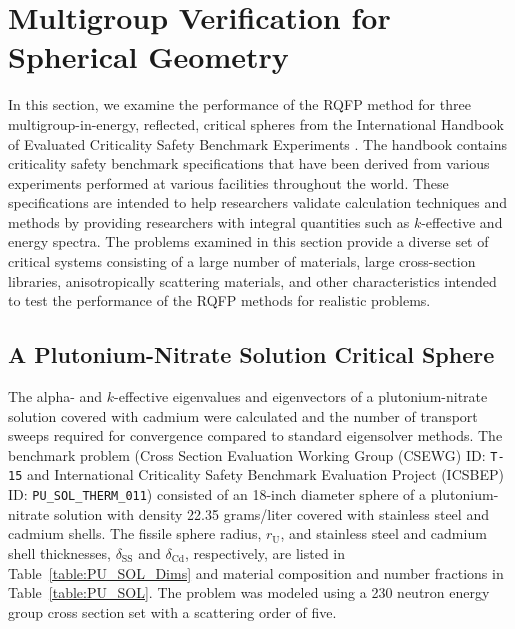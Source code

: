 \section{Multigroup Verification for Spherical Geometry}

In this section, we examine the performance of the RQFP method for three multigroup-in-energy, reflected, critical spheres from the International Handbook of Evaluated Criticality Safety Benchmark Experiments \cite{bess2015international}. The handbook contains criticality safety benchmark specifications that have been derived from various experiments performed at various facilities throughout the world. These specifications are intended to help researchers validate calculation techniques and methods by providing researchers with integral quantities such as $k$-effective and energy spectra. The problems examined in this section provide a diverse set of critical systems consisting of a large number of materials, large cross-section libraries, anisotropically scattering materials, and other characteristics intended to test the performance of the RQFP methods for realistic problems.

\subsection{A Plutonium-Nitrate Solution Critical Sphere}

The alpha- and $k$-effective eigenvalues and eigenvectors of a plutonium-nitrate solution covered with cadmium were calculated and the number of transport sweeps required for convergence compared to standard eigensolver methods. The benchmark problem (Cross Section Evaluation Working Group (CSEWG) ID: \texttt{T-15} and International Criticality Safety Benchmark Evaluation Project (ICSBEP) ID: \texttt{PU\_SOL\_THERM\_011}) consisted of an 18-inch diameter sphere of a plutonium-nitrate solution with density 22.35 grams/liter covered with stainless steel and cadmium shells. The fissile sphere radius, $r_{\text{U}}$, and stainless steel and cadmium shell thicknesses, $\delta_{\text{SS}}$ and $\delta_{\text{Cd}}$, respectively, are listed in Table~\ref{table:PU_SOL_Dims} and material composition and number fractions in Table~\ref{table:PU_SOL}. The problem was modeled using a 230 neutron energy group cross section set with a scattering order of five. 


